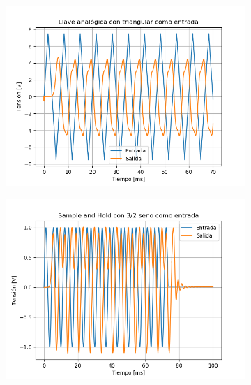 \begin{figure}[H]
\centering
\begin{subfigure}{.49\textwidth}
	\centering
	\includegraphics[width=\textwidth]{ImagenesEjercicio6/LA - Tri.png}
\end{subfigure}
\begin{subfigure}{.49\textwidth}
	\centering
	\includegraphics[width=\textwidth]{ImagenesEjercicio6/SH - 3 2.png}
\end{subfigure}
\end{figure}
